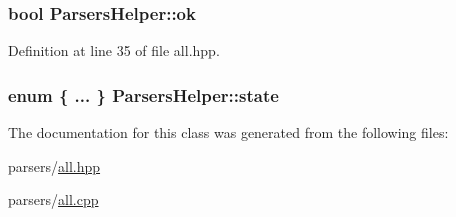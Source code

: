 \subsubsection[{ok}]{\setlength{\rightskip}{0pt plus 5cm}bool Parsers\+Helper\+::ok\hspace{0.3cm}{\ttfamily [private]}}\label{class_parsers_helper_a88e598a10d698b0962efa12ee6121436}


Definition at line 35 of file all.\+hpp.

\hypertarget{class_parsers_helper_a268b5522cce719a0c28d3e48d9b5cc04}{}
\subsubsection[{state}]{\setlength{\rightskip}{0pt plus 5cm}enum \{ ... \}   Parsers\+Helper\+::state\hspace{0.3cm}{\ttfamily [private]}}\label{class_parsers_helper_a268b5522cce719a0c28d3e48d9b5cc04}


The documentation for this class was generated from the following files\+:\begin{DoxyCompactItemize}
\item 
parsers/\hyperlink{parsers_2all_8hpp}{all.\+hpp}\item 
parsers/\hyperlink{parsers_2all_8cpp}{all.\+cpp}\end{DoxyCompactItemize}
